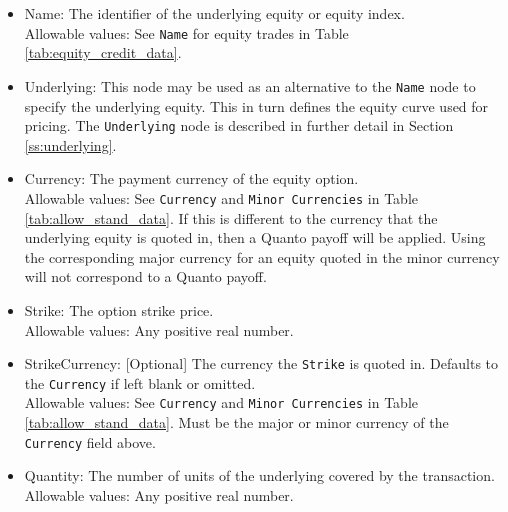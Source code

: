 \begin{itemize}
	\item Name: The identifier of the underlying equity or equity index. \\
	Allowable values: See \lstinline!Name! for equity trades in Table \ref{tab:equity_credit_data}. \\
	\item Underlying: This node may be used as an alternative to the \lstinline!Name! node to specify the underlying equity. This in turn defines the equity curve used for pricing. The \lstinline!Underlying! node is described in further detail in Section \ref{ss:underlying}. \\
	\item Currency: The payment currency of the equity option. \\
	Allowable values: See \lstinline!Currency! and \lstinline!Minor Currencies! in Table \ref{tab:allow_stand_data}.	If this is different to the currency that the underlying equity
	is quoted in, then a Quanto payoff will be applied. Using the corresponding major currency for an equity quoted in the minor currency will not correspond to a Quanto payoff.
	\item Strike: The option strike price.\\
	Allowable values: Any positive real number.	
	\item StrikeCurrency: [Optional] The currency the \lstinline!Strike! is quoted in. Defaults to the \lstinline!Currency! if left blank or omitted. \\
	Allowable values: See \lstinline!Currency! and \lstinline!Minor Currencies! in Table \ref{tab:allow_stand_data}.	Must be the major or minor currency of the \lstinline!Currency! field above.
	\item Quantity: The number of units of the underlying covered by the transaction. \\
	Allowable values: Any positive real number.
\end{itemize}